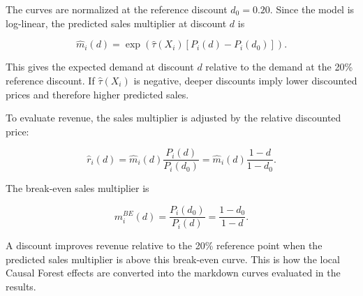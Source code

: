 The curves are normalized at the reference discount $d_0=0.20$. Since the model is log-linear, the predicted sales multiplier at discount $d$ is

\begin{equation}
\widehat{m}_i(d)=
\exp\left(\hat{\tau}(X_i)\left[P_i(d)-P_i(d_0)\right]\right).
\end{equation}

This gives the expected demand at discount $d$ relative to the demand at the 20\% reference discount. If $\hat{\tau}(X_i)$ is negative, deeper discounts imply lower discounted prices and therefore higher predicted sales.

To evaluate revenue, the sales multiplier is adjusted by the relative discounted price:

\begin{equation}
\widehat{r}_i(d)=
\widehat{m}_i(d)\frac{P_i(d)}{P_i(d_0)}
=
\widehat{m}_i(d)\frac{1-d}{1-d_0}.
\end{equation}

The break-even sales multiplier is

\begin{equation}
m_i^{BE}(d)=
\frac{P_i(d_0)}{P_i(d)}
=
\frac{1-d_0}{1-d}.
\end{equation}

A discount improves revenue relative to the 20\% reference point when the predicted sales multiplier is above this break-even curve. This is how the local Causal Forest effects are converted into the markdown curves evaluated in the results.
